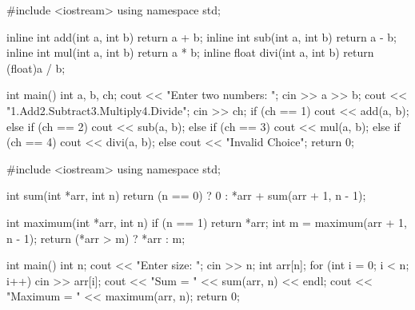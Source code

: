 \outputlabel
{}


\codelabel

\begin{code}
#include <iostream>
using namespace std;

inline int add(int a, int b) { return a + b; }
inline int sub(int a, int b) { return a - b; }
inline int mul(int a, int b) { return a * b; }
inline float divi(int a, int b) { return (float)a / b; }

int main() {
    int a, b, ch;
    cout << "Enter two numbers: "; cin >> a >> b;
    cout << "1.Add\n2.Subtract\n3.Multiply\n4.Divide\n"; cin >> ch;
    if (ch == 1) cout << add(a, b);
    else if (ch == 2) cout << sub(a, b);
    else if (ch == 3) cout << mul(a, b);
    else if (ch == 4) cout << divi(a, b);
    else cout << "Invalid Choice";
    return 0;
}
\end{code}

\outputlabel
{}


\codelabel

\begin{code}
#include <iostream>
using namespace std;

int sum(int *arr, int n) {
    return (n == 0) ? 0 : *arr + sum(arr + 1, n - 1);
}

int maximum(int *arr, int n) {
    if (n == 1) return *arr;
    int m = maximum(arr + 1, n - 1);
    return (*arr > m) ? *arr : m;
}

int main() {
    int n;
    cout << "Enter size: "; cin >> n;
    int arr[n];
    for (int i = 0; i < n; i++) cin >> arr[i];
    cout << "Sum = " << sum(arr, n) << endl;
    cout << "Maximum = " << maximum(arr, n);
    return 0;
}
\end{code}

\outputlabel
{}


